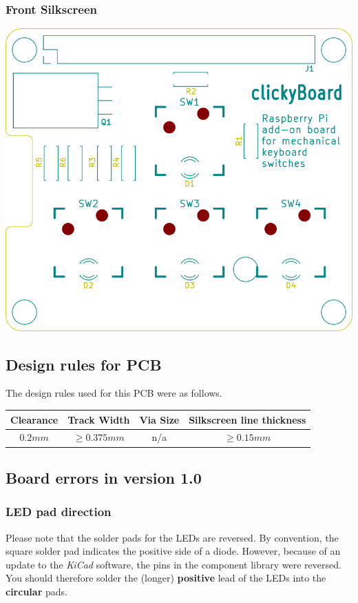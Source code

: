 \documentclass[10pt, a4paper, onesided]{article}
\begin{document}
		\subsubsection*{Front Silkscreen}
		\begin{center}
			\includegraphics[width=0.7\linewidth]{img/F_Ss}
		\end{center}
	
	\subsection*{Design rules for PCB}

		The design rules used for this PCB were as follows.
	
		\begin{tabular}{c|c|c|c}
			Clearance & Track Width & Via Size & Silkscreen line thickness \\ 
			\hline 
			$0.2 mm$ & $\ge 0.375 mm$ & n/a & $\ge 0.15 mm$ \\ 
		\end{tabular}
	
	\subsection{Board errors in version 1.0}
	
		\subsubsection*{LED pad direction}
		\label{LEDerror}
		
		Please note that the solder pads for the LEDs are reversed. By convention, the square solder pad indicates the positive side of a diode. However, because of an update to the \textit{KiCad} software, the pins in the component library were reversed. You should therefore solder the (longer) \textbf{positive} lead of the LEDs into the \textbf{circular} pads.
		
\end{document}

